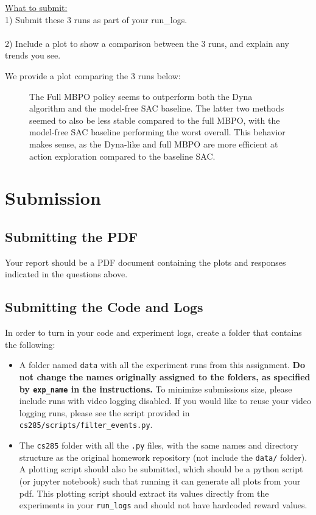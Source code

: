 \documentclass{article} %
\begin{document}
\underline{What to submit:}\\
1) Submit these 3 runs as part of your run\_logs.\\ \\
2) Include a plot to show a comparison between the 3 runs, and explain any trends you see.

\begin{sol}
  We provide a plot comparing the 3 runs below:
  \begin{figure}[ht!]
    \color{darkblue}
    \caption{The Full MBPO policy seems to outperform both the Dyna algorithm and the model-free SAC baseline. The latter two methods seemed to also be less stable compared to the full MBPO, with the model-free SAC baseline performing the worst overall. This behavior makes sense, as the Dyna-like and full MBPO are more efficient at action exploration compared to the baseline SAC.}
  \end{figure}
\end{sol}

\newpage
\section*{Submission}

\subsection{Submitting the PDF}
Your report should be a PDF document containing the plots and responses indicated in the questions above.

\subsection{Submitting the Code and Logs}
In order to turn in your code and experiment logs, create a folder that contains the following: 
\begin{itemize}
    \item A folder named \texttt{data} with all the experiment runs from this assignment.
    \textbf{Do not change the names originally assigned to the folders, as specified by \texttt{exp\_name} in the instructions.}
    To minimize submissions size, please include runs with video logging disabled. If you would like to reuse your video logging runs, please see the script provided in \verb+cs285/scripts/filter_events.py+. 
    \item The \texttt{cs285} folder with all the \texttt{.py} files, with the same names and directory structure as the original homework repository (not include the \texttt{data/} folder). A plotting script should also be submitted, which should be a python script (or jupyter notebook) such that running it can generate all plots from your pdf. This plotting script should extract its values directly from the experiments in your \texttt{run\_logs} and should not have hardcoded reward values.
\end{itemize}
\end{document}
